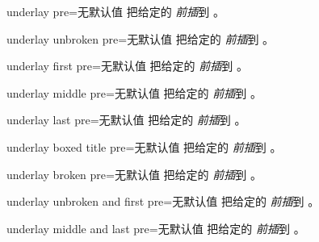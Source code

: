 \begin{docTcbKey}{underlay pre}{=}{无默认值}
  把给定的  \emph{前插}到 。
\end{docTcbKey}

\begin{docTcbKey}{underlay unbroken pre}{=}{无默认值}
  把给定的  \emph{前插}到 。
\end{docTcbKey}

\begin{docTcbKey}{underlay first pre}{=}{无默认值}
  把给定的  \emph{前插}到 。
\end{docTcbKey}

\begin{docTcbKey}{underlay middle pre}{=}{无默认值}
  把给定的  \emph{前插}到 。
\end{docTcbKey}

\begin{docTcbKey}{underlay last pre}{=}{无默认值}
  把给定的  \emph{前插}到 。
\end{docTcbKey}

\begin{docTcbKey}{underlay boxed title pre}{=}{无默认值}
  把给定的  \emph{前插}到 。
\end{docTcbKey}

\begin{docTcbKey}{underlay broken pre}{=}{无默认值}
  把给定的  \emph{前插}到 。
\end{docTcbKey}

\begin{docTcbKey}{underlay unbroken and first pre}{=}{无默认值}
  把给定的  \emph{前插}到 。
\end{docTcbKey}

\begin{docTcbKey}{underlay middle and last pre}{=}{无默认值}
  把给定的  \emph{前插}到 。
\end{docTcbKey}

